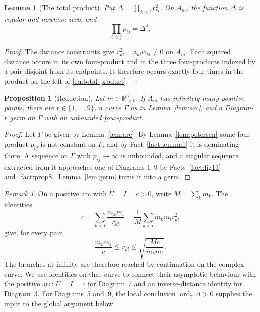 \documentclass[Threeside,11pt]{article}
\newtheorem{proposition}[theorem]{Proposition}
\newtheorem{lemma}[theorem]{Lemma}
\theoremstyle{definition}
\theoremstyle{remark}
\newtheorem{remark}[theorem]{Remark}
\numberwithin{equation}{section}
\theoremstyle{remark}
\newcommand{\Rp}{\mathbb{R}_{>0}}
\newcommand{\ord}{\operatorname{ord}}
\begin{document}
{
\begin{lemma}[The total product]\label{lem:total-product}
Put $\Delta=\prod_{k<l}r_{kl}^2$.  On $A_m$, the function $\Delta$ is regular and nowhere zero,
and
\begin{equation}\label{eq:total-product}
  \prod_{i<j}p_{ij}=\Delta^4.
\end{equation}
\end{lemma}
\begin{proof}
The distance constraints give $r_{kl}^2=z_{kl}w_{kl}\ne0$ on $A_m$.  Each squared distance occurs in its own
four-product and in the three four-products indexed by a pair disjoint from its endpoints.
It therefore occurs exactly four times in the product on the left of \eqref{eq:total-product}.
\end{proof}
}

\begin{proposition}[Reduction]\label{prop:reduction}
Let $m\in\Rp^5$.  If $A_m$ has infinitely many positive points, there are $r\in\{1,\dots,9\}$, a
curve $\Gamma$ as in Lemma~\ref{lem:arc}, and a Diagram-$r$ germ on $\Gamma$ with an unbounded
four-product.
\end{proposition}

\begin{proof}
Let $\Gamma$ be given by Lemma~\ref{lem:arc}.  By Lemma~\ref{lem:petersen} some four-product
$p_{ij}$ is not constant on $\Gamma$, and by Fact~\ref{fact:lemma1} it is dominating there.  A
sequence on $\Gamma$ with $p_{ij}\to\infty$ is unbounded, and a singular sequence extracted from
it approaches one of Diagrams 1--9 by Facts~\ref{fact:fig11} and~\ref{fact:prop8}.
Lemma~\ref{lem:germ} turns it into a germ.
\end{proof}

\begin{remark}\label{rem:levels}
On a positive arc with $U=I=c>0$, write $M=\sum_km_k$.  The identities
\[
 c=\sum_{k<l}\frac{m_km_l}{r_{kl}}
   =\frac1M\sum_{k<l}m_km_lr_{kl}^2
\]
give, for every pair,
\[
 \frac{m_km_l}{c}\le r_{kl}\le\sqrt{\frac{Mc}{m_km_l}}.
\]
The branches at infinity are therefore reached by continuation on the complex curve.
We use identities on that curve to connect their asymptotic behaviour with the positive arc:
$U=I=c$ for Diagram~7 and an inverse-distance identity for Diagram~3.  For
Diagrams~5 and~9, the local conclusion $\ord_\gamma\Delta>0$ supplies the input to the
global argument below.
\end{remark}
\end{document}
